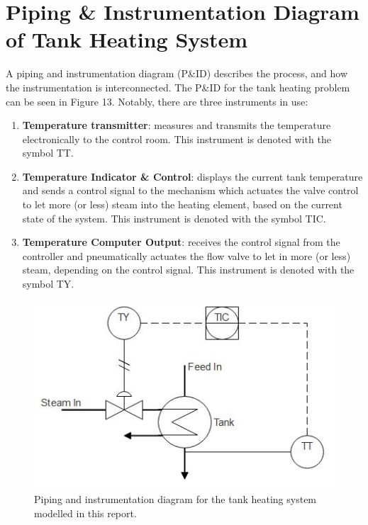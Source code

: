 \documentclass{article}
\begin{document}
\section{Piping \& Instrumentation Diagram of Tank Heating System}

A piping and instrumentation diagram (P\&ID) describes the process, and how the instrumentation is interconnected. The P\&ID for the tank heating problem can be seen in Figure 13. Notably, there are three instruments in use:
\begin{enumerate}
	\item \textbf{Temperature transmitter}: measures and transmits the temperature electronically to the control room. This instrument is denoted with the symbol TT.
	\item \textbf{Temperature Indicator \& Control}: displays the current tank temperature and sends a control signal to the mechanism which actuates the valve control to let more (or less) steam into the heating element, based on the current state of the system. This instrument is denoted with the symbol TIC.
	\item \textbf{Temperature Computer Output}: receives the control signal from the controller and pneumatically actuates the flow valve to let in more (or less) steam, depending on the control signal. This instrument is denoted with the symbol TY.
\end{enumerate}
\begin{figure}[h]
	\centering
	\includegraphics[scale=0.6]{p_id.jpg}
	\caption{Piping and instrumentation diagram for the tank heating system modelled in this report.}
\end{figure}

\end{document}
